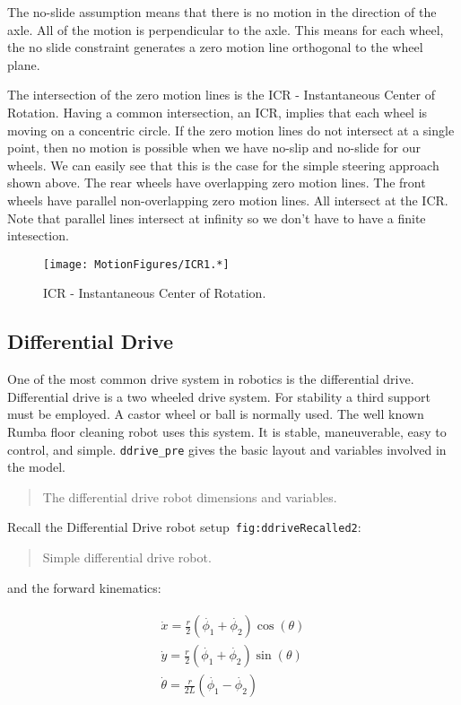 The no-slide assumption means that there is no motion in the direction
of the axle. All of the motion is perpendicular to the axle. This means
for each wheel, the no slide constraint generates a zero motion line
orthogonal to the wheel plane.

The intersection of the zero motion lines is the ICR - Instantaneous
Center of Rotation. Having a common intersection, an ICR, implies that
each wheel is moving on a concentric circle. If the zero motion lines do
not intersect at a single point, then no motion is possible when we have
no-slip and no-slide for our wheels. We can easily see that this is the
case for the simple steering approach shown above. The rear wheels have
overlapping zero motion lines. The front wheels have parallel
non-overlapping zero motion lines. All intersect at the ICR. Note that
parallel lines intersect at infinity so we don't have to have a finite
intesection.

\begin{figure}
\centering
\texttt{[image: MotionFigures/ICR1.*]}
\caption{ICR - Instantaneous Center of Rotation.}
\end{figure}

\hypertarget{differential-drive}{%
\subsection{Differential Drive}\label{differential-drive}}

One of the most common drive system in robotics is the differential
drive. Differential drive is a two wheeled drive system. For stability a
third support must be employed. A castor wheel or ball is normally used.
The well known Rumba floor cleaning robot uses this system. It is
stable, maneuverable, easy to control, and simple. \texttt{ddrive\_pre}
gives the basic layout and variables involved in the model.

\begin{quote}
The differential drive robot dimensions and variables.
\end{quote}

Recall the Differential Drive robot setup~\texttt{fig:ddriveRecalled2}:

\begin{quote}
Simple differential drive robot.
\end{quote}

and the forward kinematics:

\[\begin{aligned}
\boxed{
\begin{array}{l}
 \dot{x} = \frac{r}{2} (\dot{\phi_1}+\dot{\phi_2})\cos(\theta) \\[5mm]
\dot{y} = \frac{r}{2} (\dot{\phi_1}+\dot{\phi_2})\sin(\theta) \\[5mm]
\dot{\theta} = \frac{r}{2L} (\dot{\phi_1}-\dot{\phi_2})
\end{array}}
\end{aligned}\]

